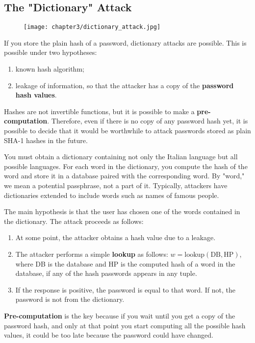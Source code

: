 \subsection{The "Dictionary" Attack}
\begin{figure}[h]
  \centering
  \texttt{[image: chapter3/dictionary\_attack.jpg]}
\end{figure}

If you store the plain hash of a password, dictionary attacks are possible. This is possible under two hypotheses:
\begin{enumerate}
  \item known hash algorithm;
  \item leakage of information, so that the attacker has a copy of the \textbf{password hash values}.
\end{enumerate}
Hashes are not invertible functions, but it is possible to make a \textbf{pre-computation}. Therefore, even if there is no copy of any password hash yet, it is possible to decide that it would be worthwhile to attack passwords stored as plain SHA-1 hashes in the future.

You must obtain a dictionary containing not only the Italian language but all possible languages.
For each word in the dictionary, you compute the hash of the word and store it in a database paired with the corresponding word.
By "word," we mean a potential passphrase, not a part of it.
Typically, attackers have dictionaries extended to include words such as names of famous people.


The main hypothesis is that the user has chosen one of the words contained in the dictionary. The attack proceeds as follows:
\begin{enumerate}
  \item At some point, the attacker obtains a hash value due to a leakage.
  \item The attacker performs a simple \textbf{lookup} as follows:
        \( w = \mathrm{lookup}(\mathrm{DB}, \mathrm{HP}) \),
        where DB is the database
        and HP is the computed hash of a word in the database, if any of the hash passwords appears in any tuple.
  \item If the response is positive, the password is equal to that word. If not, the password is not from the dictionary.
\end{enumerate}

\textbf{Pre-computation} is the key because if you wait until you get a copy of the password hash, and only at that point you start computing all the possible hash values, it could be too late because the password could have changed.

